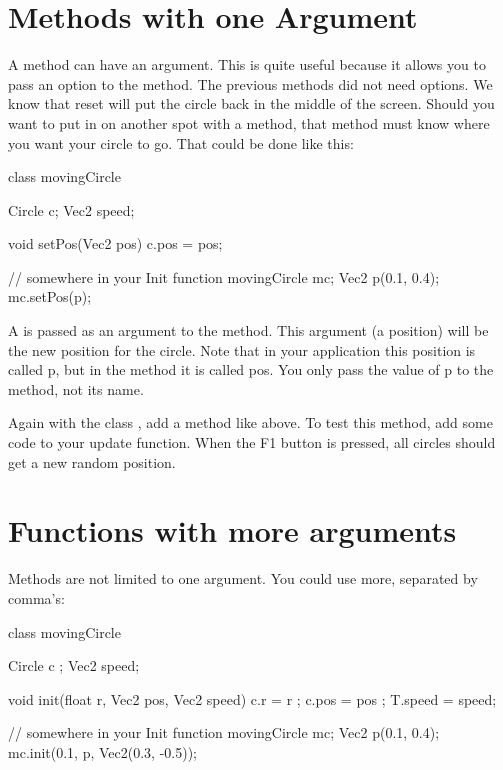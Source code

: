 \section{Methods with one Argument}
A method can have an argument. This is quite useful because it allows you to pass an option to the method. The previous methods did not need options. We know that reset will put the circle back in the middle of the screen. Should you want to put in on another spot with a method, that method must know where you want your circle to go. That could be done like this:

\begin{code}
class movingCircle {
  Circle c;
  Vec2 speed;
  
  void setPos(Vec2 pos) {
    c.pos = pos;
  }
}

// somewhere in your Init function
movingCircle mc;
Vec2 p(0.1, 0.4);
mc.setPos(p);
\end{code}

A  is passed as an argument to the method. This argument (a position) will be the new position for the circle. Note that in your application this position is called p, but in the method it is called pos. You only pass the value of p to the method, not its name.

\begin{exercise}
Again with the class , add a method  like above. To test this method, add some code to your update function. When the F1 button is pressed, all circles should get a new random position.
\end{exercise}

\section{Functions with more arguments}
Methods are not limited to one argument. You could use more, separated by comma's:

\begin{code}
class movingCircle {
  Circle c    ;
  Vec2   speed;
  
  void init(float r, Vec2 pos, Vec2 speed) {
    c.r     = r    ;
    c.pos   = pos  ;
    T.speed = speed;
  }
}

// somewhere in your Init function
movingCircle mc;
Vec2 p(0.1, 0.4);
mc.init(0.1, p, Vec2(0.3, -0.5));
\end{code}

